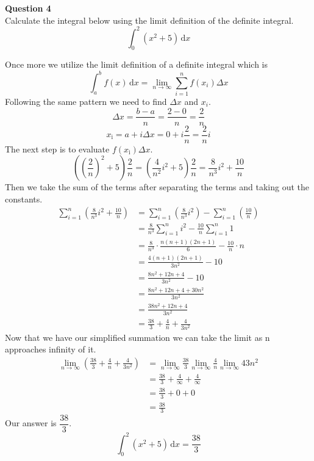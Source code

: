 \documentclass{article}
\begin{document}
\begin{enumerate}[label=(\alph*)]
\newpage

\begin{center}
\textbf{Question 4} \\
Calculate the integral below using the limit definition of the definite integral.
\[\int_{0}^2 \! (x^2+5) \, \text{d}x\]
\end{center}

Once more we utilize the limit definition of a definite integral which is
\[\int_a^b \!f(x) \, \text{d}x = \lim_{n \to \infty} {\sum_{i=1}^{n} f(x_i)\Delta x}\]
Following the same pattern we need to find $\Delta x$ and $x_i$.
\[\Delta x = \frac{b-a}{n} = \frac{2-0}{n} = \frac{2}{n}\]
\[x_\text{i} = a+i\Delta x= 0+i\frac{2}{n}=\frac{2}{n}i\]
The next step is to evaluate $f(x_\text{i})\Delta x$.
\[\left({\left(\frac{2}{n}\right)}^2+5\right)\frac{2}{n}=\left(\frac{4}{n^2}i^2+5\right)\frac{2}{n}=\frac{8}{n^3}i^2+\frac{10}{n}\]
Then we take the sum of the terms after separating the terms and taking out the constants.
\begin{align*}
\sum_{i=1}^n {\left(\frac{8}{n^3}i^2+\frac{10}{n}\right)} &=\sum_{i=1}^n {\left(\frac{8}{n^3}i^2\right)}-\sum_{i=1}^n {\left(\frac{10}{n}\right)} \\
&=\frac{8}{n^3}\sum_{i=1}^n {i^2} - \frac{10}{n}\sum_{i=1}^{n} {1} \\
&=\frac{8}{n^3}\cdot\frac{n(n+1)(2n+1)}{6}-\frac{10}{n}\cdot n \\
&=\frac{4(n+1)(2n+1)}{3n^2}-10 \\
&= \frac{8n^2+12n+4}{3n^2}-10\\
&= \frac{8n^2+12n+4+30n^2}{3n^2} \\
&=\frac{38n^2+12n+4}{3n^2} \\
&=\frac{38}{3}+\frac{4}{n}+\frac{4}{3n^2}
\end{align*}
Now that we have our simplified summation we can take the limit as n approaches infinity of it.
\begin{align*}
\lim_{n\to\infty} {\left(\frac{38}{3}+\frac{4}{n}+\frac{4}{3n^2}\right)} &= \lim_{n\to\infty} \frac{38}{3} \lim_{n\to\infty} \frac{4}{n} \lim_{n\to\infty} {4}{3n^2} \\
&= \frac{38}{3}+\frac{4}{\infty}+\frac{4}{\infty} \\
&= \frac{38}{3}+0+0 \\
&=\frac{38}{3}
\end{align*}
Our answer is $\dfrac{38}{3}$.
\[\int_{0}^2 \! (x^2+5) \, \text{d}x=\frac{38}{3}\]

\end{enumerate}
\end{document}
